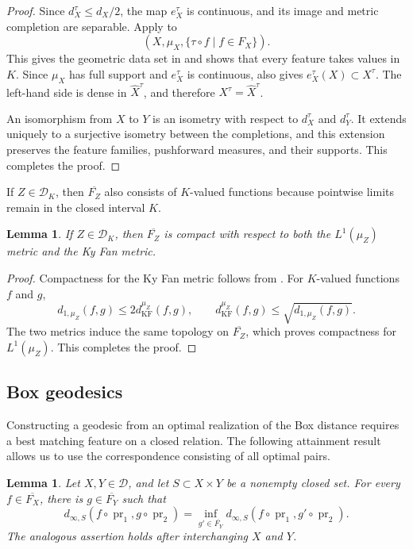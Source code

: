 \documentclass[11pt]{amsart}
\theoremstyle{plain}
\newtheorem{lemma}[theorem]{Lemma}
\theoremstyle{definition}
\theoremstyle{remark}
\newcommand{\D}{\mathcal D}
\newcommand{\DK}{\mathcal D_K}
\newcommand{\kf}{d_{\operatorname{KF}}}
\DeclareMathOperator{\pr}{pr}
\begin{document}
\begin{proof}
Since $d_X^\tau\leq d_X/2$, the map $e_X^\tau$ is continuous, and its image and metric completion are separable. Apply  to
\[
(X,\mu_X,\{\tau\circ f\mid f\in F_X\}).
\]
This gives the geometric data set in  and shows that every feature takes values in $K$. Since $\mu_X$ has full support and $e_X^\tau$ is continuous,  also gives $e_X^\tau(X)\subset X^\tau$. The left-hand side is dense in $\widehat X^\tau$, and therefore $X^\tau=\widehat X^\tau$.

An isomorphism from $X$ to $Y$ is an isometry with respect to $d_X^\tau$ and $d_Y^\tau$. It extends uniquely to a surjective isometry between the completions, and this extension preserves the feature families, pushforward measures, and their supports. This completes the proof.
\end{proof}

If $Z\in\DK$, then $\overline{F_Z}$ also consists of $K$-valued functions because pointwise limits remain in the closed interval $K$.

\begin{lemma}
\label{lem:K-feature-compactness}
If $Z\in\DK$, then $\overline{F_Z}$ is compact with respect to both the $L^1(\mu_Z)$ metric and the Ky Fan metric.
\end{lemma}

\begin{proof}
Compactness for the Ky Fan metric follows from \cite[Lemma~2.2 and Remark~2.3]{hanika2022gds}. For $K$-valued functions $f$ and $g$,
\[
d_{1,\mu_Z}(f,g)\leq2\kf^{\mu_Z}(f,g),\qquad
\kf^{\mu_Z}(f,g)\leq\sqrt{d_{1,\mu_Z}(f,g)}.
\]
The two metrics induce the same topology on $\overline{F_Z}$, which proves compactness for $L^1(\mu_Z)$. This completes the proof.
\end{proof}

\subsection{Box geodesics}
\label{subsec:box-geodesics}

Constructing a geodesic from an optimal realization of the Box distance requires a best matching feature on a closed relation. The following attainment result allows us to use the correspondence consisting of all optimal pairs.

\begin{lemma}
\label{lem:box-match-attainment}
Let $X,Y\in\D$, and let $S\subset X\times Y$ be a nonempty closed set. For every $f\in\overline{F_X}$, there is $g\in\overline{F_Y}$ such that
\[
d_{\infty,S}(f\circ\pr_1,g\circ\pr_2)
=\inf_{g'\in\overline{F_Y}}
d_{\infty,S}(f\circ\pr_1,g'\circ\pr_2).
\]
The analogous assertion holds after interchanging $X$ and $Y$.
\end{lemma}
\end{document}
